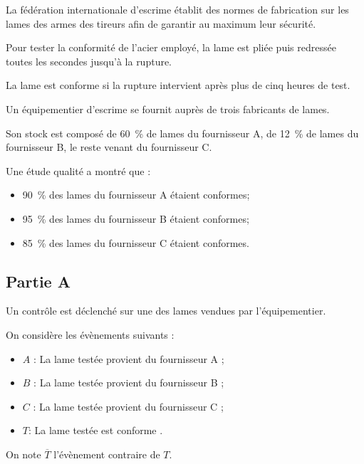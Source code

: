 La fédération internationale d'escrime établit des normes de fabrication sur les lames des armes des tireurs afin de garantir au maximum leur sécurité.
	
	
	Pour tester la conformité de l'acier employé, la lame est pliée puis redressée toutes les secondes jusqu'à la rupture.
	
	La lame est conforme si la rupture intervient après plus de cinq heures de test.
	
	\medskip
	
	Un équipementier d'escrime se fournit auprès de trois fabricants de lames.
	
	Son stock est composé de 60~\% de lames du fournisseur A, de 12~\% de lames du fournisseur B, le reste venant du fournisseur C.
	
	\medskip
	
	Une étude qualité a montré que :
	\begin{itemize}[label={\textbullet~}]
		\item 90~\% des lames du fournisseur A étaient conformes;
		\item 95~\% des lames du fournisseur B étaient conformes;
		\item 85~\% des lames du fournisseur C étaient conformes.
	\end{itemize}
	
	\subsection*{Partie A}
	Un contrôle est déclenché sur une des lames vendues par l'équipementier.
	
	\medskip
	
	On considère les évènements suivants :
	\begin{itemize}[label={\textbullet~}]
		\item $A$ : \og La lame testée provient du fournisseur A \fg{};
		\item $B$ : \og La lame testée provient du fournisseur B \fg{};
		\item $C$ : \og La lame testée provient du fournisseur C \fg{};
		\item $T$: \og La lame testée est conforme \fg{}.
	\end{itemize}
	
	On note $\overline{T}$ l'évènement contraire de $T$.
	
